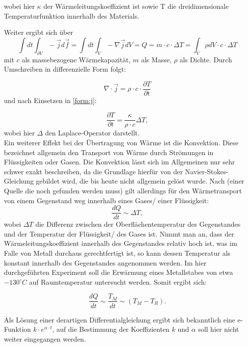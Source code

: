 wobei hier $ \kappa $ der Wärmeleitungskoeffizient ist sowie T die dreidimensionale Temperaturfunktion innerhalb des Materials. 

Weiter ergibt sich über
\begin{equation}
\int dt \int_{\partial V} -\vec{j} d \vec{f} = \int dt \int_{V} -\nabla \vec{j} dV = Q = m \cdot c \cdot \Delta T = \int_{V} \rho dV \cdot c \cdot \Delta T
\end{equation}
mit $c$ als massebezogene Wärmekapazität, $m$ als Masse, $\rho$ als Dichte. Durch Umschreiben in differenzielle Form folgt: 

\begin{equation}
\nabla \cdot \vec{j} = \rho \cdot c \cdot  \frac{\partial T}{\partial t}
\end{equation} 
und nach Einsetzen in \ref{form:j}: 

\begin{equation}
\frac{\partial T}{\partial t} = \frac{\kappa}{\rho \cdot c} \Delta T, 
\end{equation}
wobei hier $\Delta$ den Laplace-Operator darstellt. 
\\
Ein weiterer Effekt bei der Übertragung von Wärme ist die Konvektion. Diese bezeichnet allgemein den Transport von Wärme durch Strömungen in Flüssigkeiten oder Gasen. Die Konvektion lässt sich im Allgemeinen nur sehr schwer exakt beschreiben, da die Grundlage hierfür von der Navier-Stokes-Gleichung gebildet wird, die bis heute nicht allgemein gelöst wurde. Nach (einer Quelle die noch gefunden werden muss) gilt allerdings für den Wärmetransport von einem Gegenstand weg innerhalb eines Gases/ einer Flüssigkeit: 
\begin{equation}
\frac{dQ}{dt} \sim \Delta T,
\end{equation}
wobei $\Delta T$ die Differenz zwischen der Oberflächentemperatur des Gegenstandes und der Temperatur der Flüssigkeit/ des Gases ist. 
Nimmt man an, dass der Wärmeleitungskoeffizient innerhalb des Gegenstandes relativ hoch ist, was im Falle von Metall durchaus gerechtfertigt ist, so kann dessen Temperatur als konstant innerhalb des Gegenstandes angenommen werden. 
Im hier durchgeführten Experiment soll die Erwärmung eines Metallstabes von etwa $ -130 ^{\circ} C $ auf Raumtemperatur untersucht werden. Somit ergibt sich: 

\begin{equation}
\frac{dQ}{dt} \sim  \frac{T_M}{dt} \sim (T_{M} - T_{R}). 
\end{equation}

Als Lösung einer derartigen Differentialgleichung ergibt sich bekanntlich eine e-Funktion $k \cdot e^{\alpha \cdot t}$, auf die Bestimmung der Koeffizienten $k$ und $\alpha$ soll hier nicht weiter eingegangen werden. 
